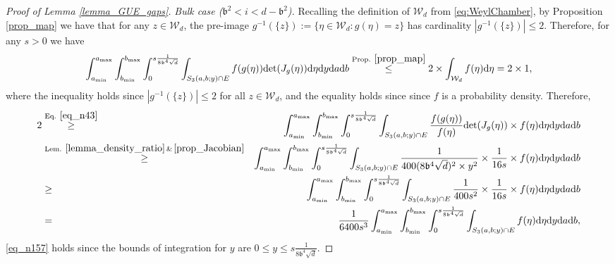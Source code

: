 \documentclass[11pt,letterpaper]{article}
\begin{document}
\begin{proof}[Proof of Lemma \ref{lemma_GUE_gaps}]

\medskip
\noindent
{\em Bulk case ($\mathfrak{b}^2 < i < d-\mathfrak{b}^2$).}
%
Recalling the definition of $\mathcal{W}_d$ from \eqref{eq:WeylChamber}, by Proposition \ref{prop_map} we have that for any $z \in \mathcal{W}_d$, the pre-image $g^{-1}(\{z\}) := \{ \eta \in \mathcal{W}_d : g(\eta) = z\}$ has cardinality $|g^{-1}(\{z\}) |  \leq 2$.
%
Therefore, for any $s>0$ we have
%
\begin{equation}\label{eq_n43}
\int_{a_{\min}}^{a_{\max}} \int_{b_{\min}}^{b_{\max}} \int_0^{s\frac{1}{8\mathfrak{b}^4\sqrt{d}}} \int_{S_3(a,b;y) \cap E} f(g(\eta)) \mathrm{det}(J_g(\eta)) \mathrm{d} \eta \mathrm{d}y \mathrm{d} a \mathrm{d} b \stackrel{\textrm{Prop. } \ref{prop_map}}{\leq} 2 \times  \int_{\mathcal{W}_d} f(\eta) \mathrm{d} \eta = 2 \times  1,
\end{equation}
%
where the inequality holds since $|g^{-1}(\{z\}) |  \leq 2$ for all $z \in \mathcal{W}_d$, and the equality holds since since $f$ is a probability density.
%
Therefore, 
%
\begin{eqnarray}\label{eq_n44}
2 & \stackrel{\textrm{Eq. } \eqref{eq_n43}}{\geq}& \int_{a_{\min}}^{a_{\max}} \int_{b_{\min}}^{b_{\max}} \int_0^{s\frac{1}{8\mathfrak{b}^4\sqrt{d}}} \int_{S_3(a,b;y) \cap E} \frac{f(g(\eta))}{f(\eta)}  \mathrm{det}(J_g(\eta))\times f(\eta) \mathrm{d} \eta \mathrm{d}y \mathrm{d} a \mathrm{d} b\nonumber\\
%
&\stackrel{\textrm{Lem. } \ref{lemma_density_ratio} \, \& \, \ref{prop_Jacobian}}{\geq}& \int_{a_{\min}}^{a_{\max}} \int_{b_{\min}}^{b_{\max}} \int_0^{s\frac{1}{8\mathfrak{b}^4\sqrt{d}}} \int_{S_3(a,b;y) \cap E} \frac{1}{400 (8 \mathfrak{b}^4 \sqrt{d})^2 \times y^2} \times \frac{1}{16s} \times f(\eta) \mathrm{d} \eta \mathrm{d}y \mathrm{d} a \mathrm{d} b\nonumber\\
%
&\geq &\int_{a_{\min}}^{a_{\max}} \int_{b_{\min}}^{b_{\max}} \int_0^{s\frac{1}{8\mathfrak{b}^4\sqrt{d}}} \int_{S_3(a,b;y) \cap E} \frac{1}{400   s^2} \times \frac{1}{16s} \times f(\eta) \mathrm{d} \eta \mathrm{d}y \mathrm{d} a \mathrm{d} b \label{eq_n157}\\
%
&=& \frac{1}{6400   s^3}  \int_{a_{\min}}^{a_{\max}} \int_{b_{\min}}^{b_{\max}} \int_0^{s\frac{1}{8\mathfrak{b}^4\sqrt{d}}} \int_{S_3(a,b;y) \cap E}  f(\eta) \mathrm{d} \eta \mathrm{d}y \mathrm{d} a \mathrm{d} b,
\end{eqnarray}
%
%
%
\eqref{eq_n157} holds since the bounds of integration for $y$ are $0\leq y \leq s\frac{1}{8\mathfrak{b}^4\sqrt{d}}$. 

\end{proof}
\end{document}

